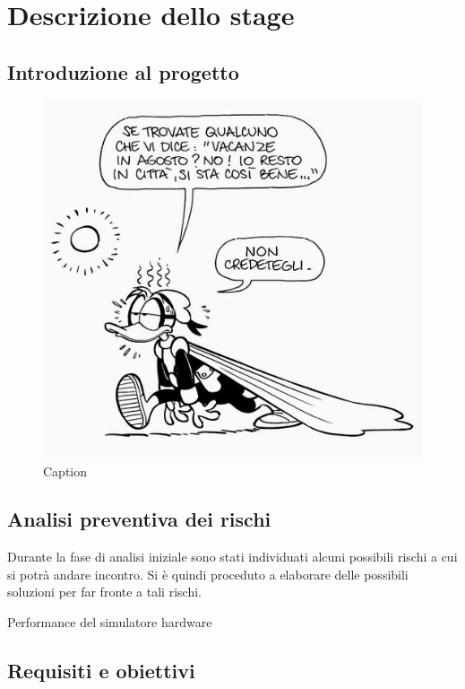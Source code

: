 \chapter{Descrizione dello stage}
\label{chap:descrizione-stage}

\section{Introduzione al progetto}
\begin{figure}[!ht] 
    \centering 
    \includegraphics[width=0.5\columnwidth]{img/pk_estate.jpeg} 
    \caption{Caption}
    \label{fig:pk_estate}
\end{figure}
\lipsum[1]

\section{Analisi preventiva dei rischi}

Durante la fase di analisi iniziale sono stati individuati alcuni possibili rischi a cui si potrà andare incontro.
Si è quindi proceduto a elaborare delle possibili soluzioni per far fronte a tali rischi.

\begin{risk}{Performance del simulatore hardware}
    \label{risk:hardware-simulator} 
\end{risk}

\section{Requisiti e obiettivi}

